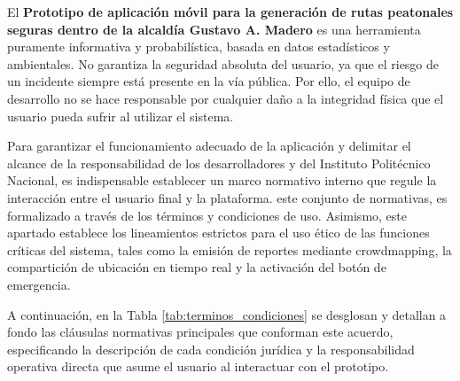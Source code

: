 El \textbf{Prototipo de aplicación móvil para la generación de rutas peatonales seguras dentro de la alcaldía Gustavo A. Madero} es una herramienta puramente informativa y probabilística, basada en datos estadísticos y ambientales. No garantiza la seguridad absoluta del usuario, ya que el riesgo de un incidente siempre está presente en la vía pública. Por ello, el equipo de desarrollo no se hace responsable por cualquier daño a la integridad física que el usuario pueda sufrir al utilizar el sistema. 

Para garantizar el funcionamiento adecuado de la aplicación y delimitar el alcance de la responsabilidad de los desarrolladores y del Instituto Politécnico Nacional, es indispensable establecer un marco normativo interno que regule la interacción entre el usuario final y la plataforma. este conjunto de normativas, es formalizado a través de los términos y condiciones de uso. Asimismo, este apartado establece los lineamientos estrictos para el uso ético de las funciones críticas del sistema, tales como la emisión de reportes mediante crowdmapping, la compartición de ubicación en tiempo real y la activación del botón de emergencia.

A continuación, en la Tabla \ref{tab:terminos_condiciones} se desglosan y detallan a fondo las cláusulas normativas principales que conforman este acuerdo, especificando la descripción de cada condición jurídica y la responsabilidad operativa directa que asume el usuario al interactuar con el prototipo.


